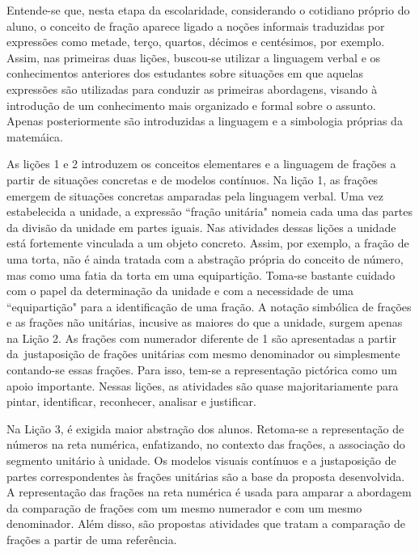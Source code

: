 
Entende-se que, nesta etapa da escolaridade, considerando o cotidiano próprio do aluno, o conceito de fração aparece ligado a  noções informais traduzidas por expressões como metade, terço, quartos, décimos e centésimos, por exemplo. Assim, nas primeiras duas lições, buscou-se utilizar a linguagem verbal e os conhecimentos anteriores dos estudantes sobre situações em que aquelas expressões são utilizadas para conduzir as primeiras abordagens, visando à introdução de um conhecimento mais organizado e formal sobre o assunto. Apenas posteriormente são introduzidas a linguagem e a simbologia próprias da matemáica. 

As lições 1 e 2 introduzem os conceitos elementares e a linguagem de frações a partir de situações concretas e de modelos contínuos. Na lição 1, as frações emergem de situações concretas amparadas pela linguagem verbal. Uma vez estabelecida a unidade, a expressão ``fração unitária" nomeia cada uma das partes da divisão da unidade em partes iguais. Nas atividades dessas lições a unidade está fortemente vinculada a um objeto concreto. Assim, por exemplo, a fração de uma torta, não é ainda tratada com a abstração própria do conceito de número, mas como uma fatia da torta em uma equipartição. Toma-se bastante cuidado com o papel da determinação da unidade e com a necessidade de uma ``equipartição" para a identificação de uma fração. A notação simbólica de frações e as frações não unitárias, incusive as maiores do que a unidade, surgem apenas na Lição 2. As frações com numerador diferente de 1 são apresentadas a partir da justaposição de frações unitárias com mesmo denominador ou simplesmente contando-se essas frações. Para isso, tem-se a representação pictórica como um apoio importante. Nessas lições, as atividades são quase majoritariamente para pintar, identificar, reconhecer, analisar e justificar. 

Na Lição 3, é exigida maior abstração dos alunos. Retoma-se a representação de números na reta numérica, enfatizando, no contexto das frações, a associação do segmento unitário à unidade. Os modelos visuais contínuos e a justaposição de partes correspondentes às frações unitárias são a base da proposta desenvolvida. A representação das frações na reta numérica é usada para amparar a abordagem da comparação de frações com um mesmo numerador e com um mesmo denominador. Além disso, são propostas atividades que tratam a comparação de frações a partir de uma referência.

